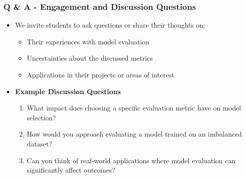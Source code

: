 \documentclass[aspectratio=169]{beamer}
\begin{document}
\begin{frame}[fragile]
    \frametitle{Q \& A - Engagement and Discussion Questions}
    \begin{itemize}
        \item We invite students to ask questions or share their thoughts on:
            \begin{itemize}
                \item Their experiences with model evaluation
                \item Uncertainties about the discussed metrics
                \item Applications in their projects or areas of interest
            \end{itemize}
        \item \textbf{Example Discussion Questions}
            \begin{enumerate}
                \item What impact does choosing a specific evaluation metric have on model selection?
                \item How would you approach evaluating a model trained on an imbalanced dataset?
                \item Can you think of real-world applications where model evaluation can significantly affect outcomes?
            \end{enumerate}
    \end{itemize}
\end{frame}
\end{document}

